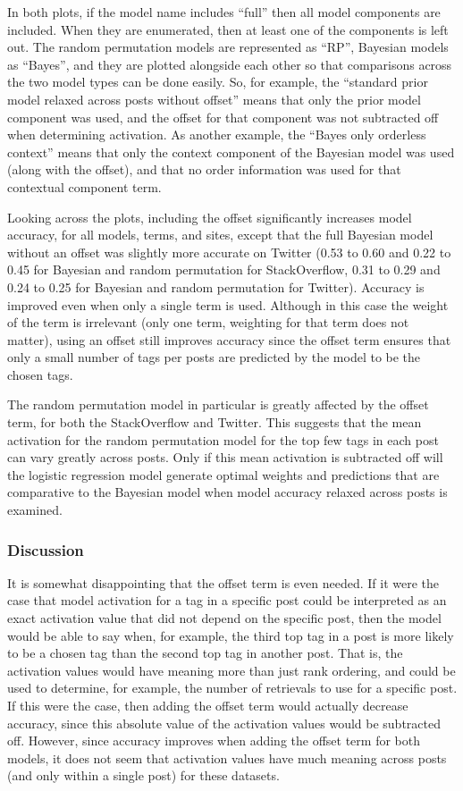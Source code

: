 \documentclass[man,floatsintext,donotrepeattitle]{apa6}
\begin{document}
In both plots, if the model name includes ``full'' then all model components are included.
When they are enumerated, then at least one of the components is left out.
The random permutation models are represented as ``RP'', Bayesian models as ``Bayes'', and they are plotted alongside each other so that comparisons across the two model types can be done easily.
So, for example, the ``standard prior model relaxed across posts without offset'' means that only the prior model component was used, and the offset for that component was not subtracted off when determining activation.
As another example, the ``Bayes only orderless context'' means that only the context component of the Bayesian model was used (along with the offset), and that no order information was used for that contextual component term.

Looking across the plots, including the offset significantly increases model accuracy, for all models, terms, and sites, except that the full Bayesian model without an offset was slightly more accurate on Twitter
(\num{.53} to \num{.60} and \num{.22} to \num{.45} for Bayesian and random permutation for StackOverflow, \num{.31} to \num{.29} and \num{.24} to \num{.25} for Bayesian and random permutation for Twitter).
Accuracy is improved even when only a single term is used.
Although in this case the weight of the term is irrelevant (only one term, weighting for that term does not matter),
using an offset still improves accuracy since the offset term ensures that only a small number of tags per posts are predicted by the model to be the chosen tags. 

The random permutation model in particular is greatly affected by the offset term, for both the StackOverflow and Twitter.
This suggests that the mean activation for the random permutation model for the top few tags in each post can vary greatly across posts.
Only if this mean activation is subtracted off will the logistic regression model generate optimal weights and predictions that are comparative to the Bayesian model when model accuracy relaxed across posts is examined.

\subsubsection{Discussion}

It is somewhat disappointing that the offset term is even needed.
If it were the case that model activation for a tag in a specific post could be interpreted as an exact activation value that did not depend on the specific post,
then the model would be able to say when, for example, the third top tag in a post is more likely to be a chosen tag than the second top tag in another post.
That is, the activation values would have meaning more than just rank ordering, and could be used to determine, for example, the number of retrievals to use for a specific post.
If this were the case, then adding the offset term would actually decrease accuracy, since this absolute value of the activation values would be subtracted off.
However, since accuracy improves when adding the offset term for both models, it does not seem that activation values have much meaning across posts (and only within a single post) for these datasets.
\end{document}
